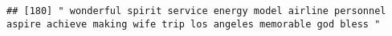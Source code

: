 \documentclass[
]{article}
\begin{document}
\begin{verbatim}
## [180] " wonderful spirit service energy model airline personnel aspire achieve making wife trip los angeles memorable god bless "                                                                                                                                                                                                                                                                                                                                                                                                                                                                                                                                                                                                                                                                                                                                                                                                                                                                                                                                                                                                                                                                                                                                                                                                                                                                                                                                                                                                                                                                                                                                                                                                                                                                     

\end{verbatim}
\end{document}
